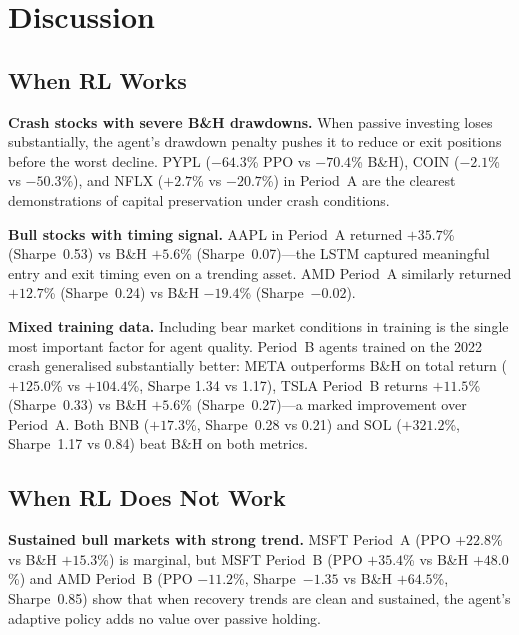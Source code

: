 \documentclass[12pt,a4paper]{article}
\begin{document}
\section{Discussion}

\subsection{When RL Works}

\textbf{Crash stocks with severe B\&H drawdowns.}
When passive investing loses substantially, the agent's drawdown penalty
pushes it to reduce or exit positions before the worst decline.
PYPL ($-64.3$\% PPO vs $-70.4$\% B\&H), COIN ($-2.1$\% vs $-50.3$\%),
and NFLX ($+2.7$\% vs $-20.7$\%) in Period~A are the clearest
demonstrations of capital preservation under crash conditions.

\textbf{Bull stocks with timing signal.}
AAPL in Period~A returned $+35.7$\% (Sharpe~0.53) vs B\&H
$+5.6$\% (Sharpe~0.07)---the LSTM captured meaningful entry and exit
timing even on a trending asset. AMD Period~A similarly returned
$+12.7$\% (Sharpe~0.24) vs B\&H $-19.4$\% (Sharpe~$-0.02$).

\textbf{Mixed training data.}
Including bear market conditions in training is the single most important
factor for agent quality. Period~B agents trained on the 2022 crash
generalised substantially better: META outperforms B\&H on total return
($+125.0$\% vs $+104.4$\%, Sharpe 1.34 vs 1.17), TSLA Period~B returns
$+11.5$\% (Sharpe~0.33) vs B\&H $+5.6$\% (Sharpe~0.27)---a marked
improvement over Period~A. Both BNB ($+17.3$\%, Sharpe~0.28 vs 0.21)
and SOL ($+321.2$\%, Sharpe~1.17 vs 0.84) beat B\&H on both metrics.


\subsection{When RL Does Not Work}

\textbf{Sustained bull markets with strong trend.}
MSFT Period~A (PPO $+22.8$\% vs B\&H $+15.3$\%) is marginal, but
MSFT Period~B (PPO $+35.4$\% vs B\&H $+48.0$\%) and AMD Period~B
(PPO $-11.2$\%, Sharpe~$-1.35$ vs B\&H $+64.5$\%, Sharpe~0.85) show
that when recovery trends are clean and sustained, the agent's adaptive
policy adds no value over passive holding.
\end{document}
